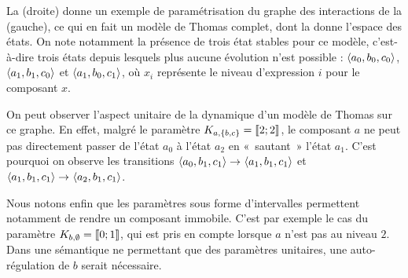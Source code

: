 \begin{example}
  La (droite) donne un exemple de paramétrisation
  du graphe des interactions de la (gauche),
  ce qui en fait un modèle de Thomas complet,
  dont la  donne l'espace des états.
  On note notamment la présence de trois état stables pour ce modèle,
  c'est-à-dire trois états depuis lesquels plus aucune évolution n'est possible :
  $\mbox{$\langle a_0, b_0, c_0 \rangle$}$, $\mbox{$\langle a_1, b_1, c_0 \rangle$}$ et $\mbox{$\langle a_1, b_0, c_1 \rangle$}$,
  où $x_i$ représente le niveau d'expression $i$ pour le composant $x$.
  
  On peut observer l'aspect unitaire de la dynamique d'un modèle de Thomas sur ce graphe.
  En effet, malgré le paramètre $K_{a,\{b,c\}} = \mathopen{\llbracket}2\mathclose{};2\mathclose{\rrbracket}$, le composant $a$ ne peut
  pas directement passer de l'état $a_0$ à l'état $a_2$ en «~sautant~» l'état $a_1$.
  C'est pourquoi on observe les transitions
  $\mbox{$\langle a_0,b_1,c_1 \rangle$} \rightarrow_{} \mbox{$\langle a_1,b_1,c_1 \rangle$}$ et
  $\mbox{$\langle a_1,b_1,c_1 \rangle$} \rightarrow_{} \mbox{$\langle a_2,b_1,c_1 \rangle$}$.
  
  Nous notons enfin que les paramètres sous forme d'intervalles permettent notamment
  de rendre un composant immobile.
  C'est par exemple le cas du paramètre $K_{b,\emptyset} = \mathopen{\llbracket}0\mathclose{};1\mathclose{\rrbracket}$,
  qui est pris en compte lorsque $a$ n'est pas au niveau $2$.
  Dans une sémantique ne permettant que des paramètres unitaires, une auto-régulation de $b$
  serait nécessaire.
  

\end{example}
